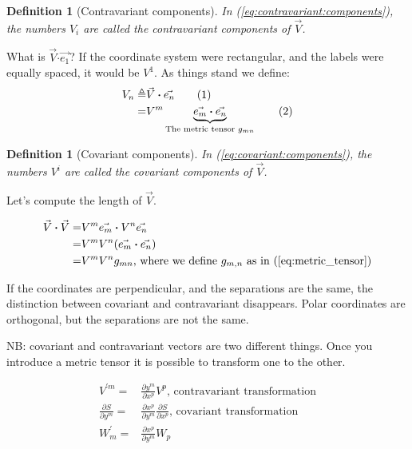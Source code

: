 \documentclass[]{article}
\newcommand\numberthis{\addtocounter{equation}{1}\tag{\theequation}}
\newtheorem{defn}[thm]{Definition}
\begin{document}
\begin{defn}[Contravariant components]
	 In (\ref{eq:contravariant:components}), the numbers $V_i$ are called the\emph{ contravariant components} of $\vec{V}$.
\end{defn}

What is $\vec{V} \boldsymbol{\cdot} \vec{e_1}$? If the coordinate system were rectangular, and the labels were equally spaced, it would be $V^1$. As things stand we define:
\begin{align*}
	V_n \triangleq & \vec{V} \boldsymbol{\cdot} \vec{e_n} \numberthis \label{eq:covariant:components}\\
	=& V^m \underbrace{\vec{e_m}\boldsymbol{\cdot} \vec{e_n}}_\text{The metric tensor $g_{mn}$} \numberthis \label{eq:metric_tensor}
\end{align*}

\begin{defn}[Covariant components]
	In (\ref{eq:covariant:components}), the numbers $V^i$ are called the\emph{ covariant components} of $\vec{V}$.
\end{defn}

Let's compute the length of $\vec{V}$.

\begin{align*}
	\vec{V}\boldsymbol{\cdot} \vec{V} =& V^m \vec{e_m}\boldsymbol{\cdot} V^n \vec{e_n}\\
	=& V^m V^n (\vec{e_m}\boldsymbol{\cdot} \vec{e_n})\\
	=&  V^m V^n g_{mn} \text{, where we define $g_{m,n}$ as in (\ref{eq:metric_tensor})}
\end{align*}

If the coordinates are perpendicular, and the separations are the same, the distinction between covariant and contravariant disappears. Polar coordinates are orthogonal, but the separations are not the same.

NB: covariant and contravariant vectors are two different things. Once you introduce a metric tensor it is possible to transform one to the other.

\begin{align*}
	V^{\prime m} =&  \frac{\partial y^m}{\partial x^p} V^p \text{, contravariant transformation}\\
	\frac{\partial S}{\partial y^m} =& \frac{\partial x^p}{\partial y^m} \frac{\partial S}{\partial x^p} \text{, covariant transformation}\\
	W_m^\prime =& \frac{\partial x^p}{\partial y^m} W_p
\end{align*}
\end{document}
